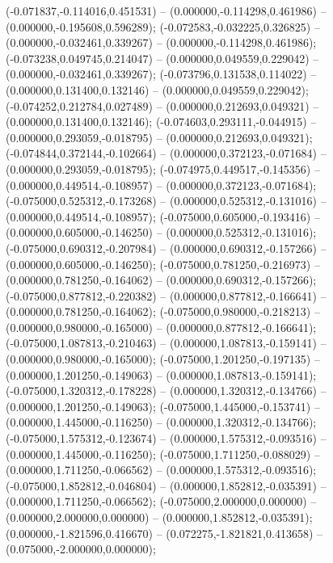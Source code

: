 (-0.071837,-0.114016,0.451531) -- (0.000000,-0.114298,0.461986) -- (0.000000,-0.195608,0.596289);
 (-0.072583,-0.032225,0.326825) -- (0.000000,-0.032461,0.339267) -- (0.000000,-0.114298,0.461986);
 (-0.073238,0.049745,0.214047) -- (0.000000,0.049559,0.229042) -- (0.000000,-0.032461,0.339267);
 (-0.073796,0.131538,0.114022) -- (0.000000,0.131400,0.132146) -- (0.000000,0.049559,0.229042);
 (-0.074252,0.212784,0.027489) -- (0.000000,0.212693,0.049321) -- (0.000000,0.131400,0.132146);
 (-0.074603,0.293111,-0.044915) -- (0.000000,0.293059,-0.018795) -- (0.000000,0.212693,0.049321);
 (-0.074844,0.372144,-0.102664) -- (0.000000,0.372123,-0.071684) -- (0.000000,0.293059,-0.018795);
 (-0.074975,0.449517,-0.145356) -- (0.000000,0.449514,-0.108957) -- (0.000000,0.372123,-0.071684);
 (-0.075000,0.525312,-0.173268) -- (0.000000,0.525312,-0.131016) -- (0.000000,0.449514,-0.108957);
 (-0.075000,0.605000,-0.193416) -- (0.000000,0.605000,-0.146250) -- (0.000000,0.525312,-0.131016);
 (-0.075000,0.690312,-0.207984) -- (0.000000,0.690312,-0.157266) -- (0.000000,0.605000,-0.146250);
 (-0.075000,0.781250,-0.216973) -- (0.000000,0.781250,-0.164062) -- (0.000000,0.690312,-0.157266);
 (-0.075000,0.877812,-0.220382) -- (0.000000,0.877812,-0.166641) -- (0.000000,0.781250,-0.164062);
 (-0.075000,0.980000,-0.218213) -- (0.000000,0.980000,-0.165000) -- (0.000000,0.877812,-0.166641);
 (-0.075000,1.087813,-0.210463) -- (0.000000,1.087813,-0.159141) -- (0.000000,0.980000,-0.165000);
 (-0.075000,1.201250,-0.197135) -- (0.000000,1.201250,-0.149063) -- (0.000000,1.087813,-0.159141);
 (-0.075000,1.320312,-0.178228) -- (0.000000,1.320312,-0.134766) -- (0.000000,1.201250,-0.149063);
 (-0.075000,1.445000,-0.153741) -- (0.000000,1.445000,-0.116250) -- (0.000000,1.320312,-0.134766);
 (-0.075000,1.575312,-0.123674) -- (0.000000,1.575312,-0.093516) -- (0.000000,1.445000,-0.116250);
 (-0.075000,1.711250,-0.088029) -- (0.000000,1.711250,-0.066562) -- (0.000000,1.575312,-0.093516);
 (-0.075000,1.852812,-0.046804) -- (0.000000,1.852812,-0.035391) -- (0.000000,1.711250,-0.066562);
 (-0.075000,2.000000,0.000000) -- (0.000000,2.000000,0.000000) -- (0.000000,1.852812,-0.035391);
 (0.000000,-1.821596,0.416670) -- (0.072275,-1.821821,0.413658) -- (0.075000,-2.000000,0.000000);
